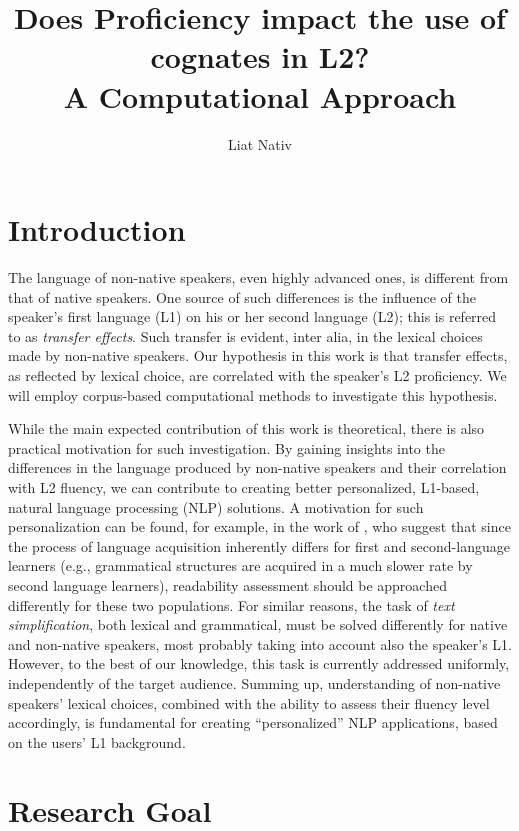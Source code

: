 \documentclass[11pt]{article}
\title{Does Proficiency impact the use of cognates in L2?\\[.5em]A Computational Approach}
\author{Liat Nativ}
\date{}
\begin{document}
\maketitle
\thispagestyle{empty}

\section{Introduction}

The language of non-native speakers, even highly advanced ones, is different from that of native speakers. One source of such differences is the influence of the speaker's first language (L1) on his or her second language (L2); this is referred to as \emph{transfer effects}. Such transfer is evident, inter alia, in the lexical choices made by non-native speakers. 
%
Our hypothesis in this work is that transfer effects, as reflected by lexical choice, are correlated with the speaker's L2 proficiency. We will employ corpus-based computational methods to investigate this hypothesis.

While the main expected contribution of this work is theoretical, there is also practical motivation for such investigation. By gaining insights into the differences in the language produced by non-native speakers and their correlation with L2 fluency, we can contribute to creating better personalized, L1-based, natural language processing (NLP) solutions. 
A motivation for such personalization can be found, for example, in the work of \cite{heilman-etal-2007-combining},
who suggest that since the process of language 
acquisition inherently differs for first and second-language learners (e.g., grammatical structures are acquired in a much slower rate by second language learners), 
readability assessment should be approached differently for these two populations. 
For similar reasons, the task of \emph{text simplification}, both lexical and grammatical, must be solved differently for native and non-native speakers, most probably taking into account also the speaker's L1. However, to the best of our knowledge, this task is currently addressed uniformly, independently of the target audience.
Summing up, understanding of non-native speakers' lexical choices, combined with the ability to assess their fluency level accordingly,
is fundamental for creating ``personalized'' NLP applications, based on the users' L1 background.

\section{Research Goal}
\end{document}
